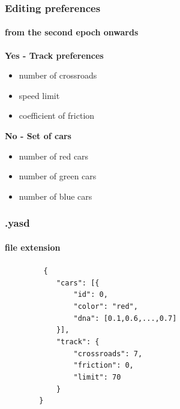 \documentclass{beamer}
\begin{document}
\begin{frame}
	\frametitle{Editing preferences}
	\framesubtitle{from the second epoch onwards}

	\begin{exampleblock}{\textbf{Yes - Track preferences}}
		\begin{itemize}
			\item number of crossroads
			\item speed limit
			\item coefficient of friction
		\end{itemize}
	\end{exampleblock}

	\begin{alertblock}{\textbf{No - Set of cars}}
		\begin{itemize}
			\item number of red cars
			\item number of green cars
			\item number of blue cars
		\end{itemize}
	\end{alertblock}
\end{frame}

\begin{frame}
	\frametitle{.yasd}
	\framesubtitle{file extension}
	{\tt
	~~~~~~~~\{\\
	~~~~~~~~~~~~"cars": [\{\\
	~~~~~~~~~~~~~~~~"id": 0,\\
	~~~~~~~~~~~~~~~~"color": "red",\\
	~~~~~~~~~~~~~~~~"dna": [0.1,0.6,...,0.7]\\
	~~~~~~~~~~~~\}],\\
	~~~~~~~~~~~~"track": \{\\
	~~~~~~~~~~~~~~~~"crossroads": 7,\\
	~~~~~~~~~~~~~~~~"friction": 0,\\
	~~~~~~~~~~~~~~~~"limit": 70\\
	~~~~~~~~~~~~\}\\
	~~~~~~~~\}\\
	}
\end{frame}
\end{document}
